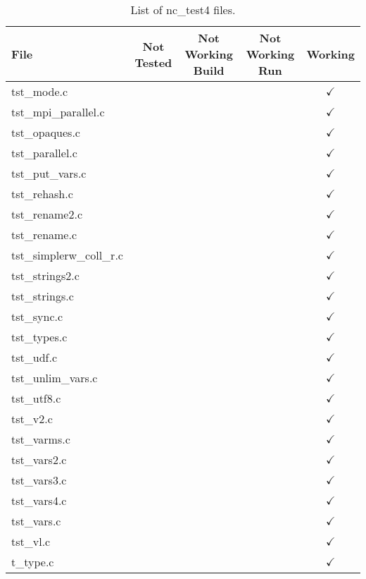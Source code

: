 \begin{table}[H]
\centering
\begin{tabular}{|l|c|c|c|c|}
\hline
File & Not Tested & Not Working Build & Not Working Run & Working \\ \hline \hline
tst\_mode.c   &  &   &   & $\checkmark$    \\ \hline
tst\_mpi\_parallel.c   &  &   &   & $\checkmark$    \\ \hline
tst\_opaques.c   &  &   &   & $\checkmark$    \\ \hline
tst\_parallel.c   &  &   &   & $\checkmark$    \\ \hline
tst\_put\_vars.c   &  &   &   & $\checkmark$    \\ \hline
tst\_rehash.c   &  &   &   & $\checkmark$    \\ \hline
tst\_rename2.c   &  &   &   & $\checkmark$    \\ \hline
tst\_rename.c   &  &   &   & $\checkmark$    \\ \hline
tst\_simplerw\_coll\_r.c   &  &   &   & $\checkmark$    \\ \hline
tst\_strings2.c   &  &   &   & $\checkmark$    \\ \hline
tst\_strings.c   &  &   &   & $\checkmark$    \\ \hline
tst\_sync.c   &  &   &   & $\checkmark$    \\ \hline
tst\_types.c   &  &   &   & $\checkmark$    \\ \hline
tst\_udf.c   &  &   &   & $\checkmark$    \\ \hline
tst\_unlim\_vars.c   &  &   &   & $\checkmark$    \\ \hline
tst\_utf8.c   &  &   &   & $\checkmark$    \\ \hline
tst\_v2.c   &  &   &   & $\checkmark$    \\ \hline
tst\_varms.c   &  &   &   & $\checkmark$    \\ \hline
tst\_vars2.c   &  &   &   & $\checkmark$    \\ \hline
tst\_vars3.c   &  &   &   & $\checkmark$    \\ \hline
tst\_vars4.c   &  &   &   & $\checkmark$    \\ \hline
tst\_vars.c   &  &   &   & $\checkmark$    \\ \hline
tst\_vl.c   &  &   &   & $\checkmark$    \\ \hline
t\_type.c   &  &   &   & $\checkmark$    \\ \hline
\hline
\end{tabular}
\caption{List of nc\_test4 files.}
\end{table}

